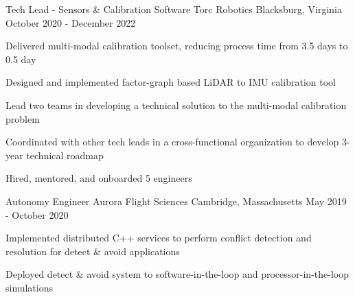 \begin{cventries}
  \cventry
    {Tech Lead - Sensors \& Calibration Software} %
    {Torc Robotics} %
    {Blacksburg, Virginia} %
    {October 2020 - December 2022} %
    {
      \begin{cvitems}
          \item{Delivered multi-modal calibration toolset, reducing process time from 3.5 days to 0.5 day}
          \item{Designed and implemented factor-graph based LiDAR to IMU calibration tool}
          \item{Lead two teams in developing a technical solution to the multi-modal calibration problem}
          \item{Coordinated with other tech leads in a cross-functional organization to develop 3-year technical roadmap}
          \item{Hired, mentored, and onboarded 5 engineers}
      \end{cvitems}
    }

  \cventry
    {Autonomy Engineer} %
    {Aurora Flight Sciences} %
    {Cambridge, Massachusetts} %
    {May 2019 - October 2020} %
    {
      \begin{cvitems}
          \item{Implemented distributed C++ services to perform conflict detection and resolution for detect \& avoid applications}
          \item{Deployed detect \& avoid system to software-in-the-loop and processor-in-the-loop simulations}
      \end{cvitems}
    }



\end{cventries}
